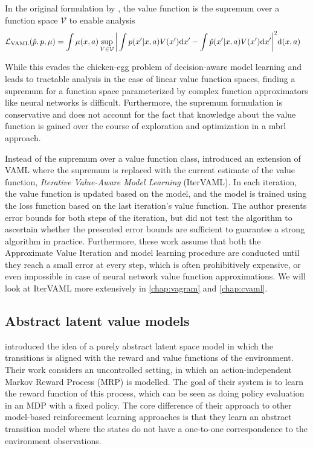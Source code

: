 In the original formulation by \textcite{vaml}, the value function is the supremum over a function space $\mathcal{V}$ to enable analysis
\begin{align}
    &\mathcal{L}_\text{VAML}(\hat{p}, p, \mu) = \int \mu(x,a) \sup_{V\in \mathcal{V}}\bigg|\int p(x'|x,a)V(x')\mathrm{d}x'  - \int \hat{p}(x'|x,a) V(x') \mathrm{d}x'\bigg|^2 \mathrm{d} (x,a)
\end{align}

While this evades the chicken-egg problem of decision-aware model learning and leads to tractable analysis in the case of linear value function spaces, finding a supremum for a function space parameterized by complex function approximators like neural networks is difficult.
Furthermore, the supremum formulation is conservative and does not account for the fact that knowledge about the value function is gained over the course of exploration and optimization in a \ac{mbrl} approach.

Instead of the supremum over a value function class, \textcite{itervaml} introduced an extension of VAML where the supremum is replaced with the current estimate of the value function, \emph{Iterative Value-Aware Model Learning} (IterVAML).
In each iteration, the value function is updated based on the model, and the model is trained using the loss function based on the last iteration's value function.
The author presents error bounds for both steps of the iteration, but did not test the algorithm to ascertain whether the presented error bounds are sufficient to guarantee a strong algorithm in practice. 
Furthermore, these work assume that both the Approximate Value Iteration and model learning procedure are conducted until they reach a small error at every step, which is often prohibitively expensive, or even impossible in case of neural network value function approximations.
We will look at IterVAML more extensively in \autoref{chap:vagram} and \autoref{chap:cvaml}.


\subsection{Abstract latent value models}

\textcite{silver2017predictron} introduced the idea of a purely abstract latent space model in which the transitions is aligned with the reward and value functions of the environment.
Their work considers an uncontrolled setting, in which an action-independent Markov Reward Process (MRP) is modelled.
The goal of their system is to learn the reward function of this process, which can be seen as doing policy evaluation in an MDP with a fixed policy.
The core difference of their approach to other model-based reinforcement learning approaches is that they learn an abstract transition model where the states do not have a one-to-one correspondence to the environment observations.

